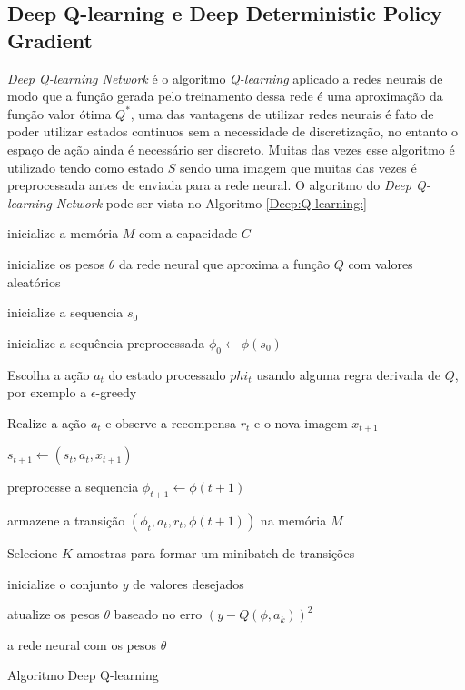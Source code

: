 \subsection{Deep Q-learning e Deep Deterministic Policy Gradient }
\textit{Deep Q-learning Network} é o algoritmo \textit{Q-learning}
aplicado a redes neurais de modo que a função gerada pelo treinamento
dessa rede é uma aproximação da função valor ótima $Q^*$, uma das vantagens
de utilizar redes neurais é fato de poder utilizar estados continuos sem a
necessidade de discretização, no entanto o espaço de ação ainda é necessário
ser discreto. Muitas das vezes esse algoritmo é utilizado
tendo como estado $S$ sendo uma imagem que muitas das vezes é preprocessada
antes de enviada para a rede neural. O algoritmo do \textit{Deep Q-learning Network}
pode ser vista no Algoritmo \ref{Deep:Q-learning:}


\begin{algorithm}[H]
    inicialize a memória $M$ com a capacidade $C$

    inicialize os pesos $\theta$ da rede neural que aproxima a função $Q$ com valores aleatórios

     {
        inicialize a sequencia $s_0$

        inicialize a sequência preprocessada $\phi_0 \leftarrow \phi(s_0)$ 
        

         {
            Escolha a ação $a_t$ do estado processado $phi_t$ usando alguma regra derivada de $Q$,
            por exemplo a $\epsilon$-greedy

            Realize a ação $a_t$ e observe a recompensa $r_t$ e o nova imagem $x_{t+1}$
            
            $s_{t+1}  \leftarrow (s_t, a_t, x_{t+1})$   

            preprocesse a sequencia $\phi_{t+1} \leftarrow \phi(t+1)$
            
            armazene a transição $(\phi_t,a_t,r_t,\phi(t+1))$ na memória $M$

            Selecione $K$ amostras para formar um minibatch de transições

            inicialize o conjunto $y$ de valores desejados


            atualize os pesos $\theta$ baseado no erro $(y -Q(\phi,a_k))^2$

        }
        
    }
    \Retorna a rede neural com os pesos $\theta$
    \caption{Algoritmo Deep Q-learning}
    \label{Deep:Q-learning:}
\end{algorithm}



